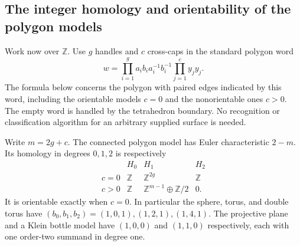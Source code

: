 \subsection{The integer homology and orientability of the polygon models}
Work now over $\mathbb Z$. Use $g$ handles and $c$ cross-caps in the
standard polygon word
\[
 w=\prod_{i=1}^{g}a_ib_ia_i^{-1}b_i^{-1}
       \prod_{j=1}^{c}y_jy_j .
\]
The formula below concerns the polygon with paired edges indicated by
this word, including the orientable models $c=0$ and the nonorientable
ones $c>0$. The empty word is handled by the tetrahedron boundary.
No recognition or classification algorithm for an arbitrary supplied
surface is needed.

\begin{theorem}\label{idx-algebraic402}
Write $m=2g+c$. The connected polygon model has Euler characteristic
$2-m$. Its homology in degrees $0,1,2$ is respectively
\[
\begin{array}{c|ccc}
 &H_0&H_1&H_2\\ \hline
 c=0 &\mathbb Z&\mathbb Z^{2g}&\mathbb Z\\
 c>0 &\mathbb Z&\mathbb Z^{m-1}\oplus\mathbb Z/2&0 .
\end{array}
\]
It is orientable exactly when $c=0$. In particular the sphere, torus,
and double torus have $(b_0,b_1,b_2)=(1,0,1),(1,2,1),(1,4,1)$.
The projective plane and a Klein bottle model have $(1,0,0)$ and
$(1,1,0)$ respectively, each with one order-two summand in degree one.
\end{theorem}
